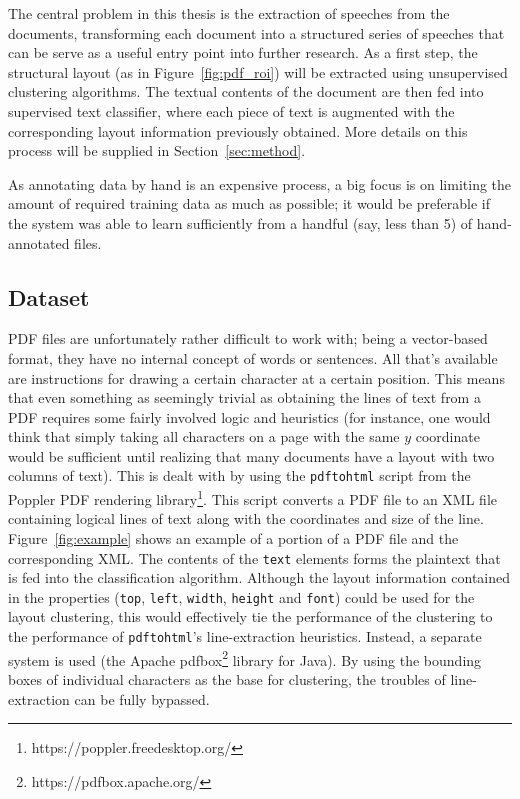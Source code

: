 The central problem in this thesis is the extraction of speeches from the
documents, transforming each document into a structured series of speeches that
can be serve as a useful entry point into further research. As a first step, the
structural layout (as in Figure~\ref{fig:pdf_roi}) will be extracted using
unsupervised clustering algorithms. The textual contents of the document are
then fed into supervised text classifier, where each piece of text is augmented
with the corresponding layout information previously obtained. More details on
this process will be supplied in Section~\ref{sec:method}.

As annotating data by hand is an expensive process, a big focus is on limiting
the amount of required training data as much as possible; it would be preferable
if the system was able to learn sufficiently from a handful (say, less than 5)
of hand-annotated files.

\subsection{Dataset}
PDF files are unfortunately rather difficult to work with; being a vector-based
format, they have no internal concept of words or sentences. All that's
available are instructions for drawing a certain character at a certain
position. This means that even something as seemingly trivial as obtaining the
lines of text from a PDF requires some fairly involved logic and heuristics (for
instance, one would think that simply taking all characters on a page with the
same $y$ coordinate would be sufficient until realizing that many documents have
a layout with two columns of text). This is dealt with by using the
\texttt{pdftohtml} script from the Poppler PDF rendering
library\footnote{https://poppler.freedesktop.org/}. This script converts a PDF
file to an XML file containing logical lines of text along with the coordinates
and size of the line. Figure~\ref{fig:example} shows an example of a portion of
a PDF file and the corresponding XML\@. The contents of the \texttt{text} elements
forms the plaintext that is fed into the classification algorithm. Although the
layout information contained in the properties (\texttt{top}, \texttt{left},
\texttt{width}, \texttt{height} and \texttt{font}) could be used for the layout
clustering, this would effectively tie the performance of the clustering to the
performance of \texttt{pdftohtml}'s line-extraction heuristics. Instead, a
separate system is used (the Apache pdfbox\footnote{https://pdfbox.apache.org/}
library for Java). By using the bounding boxes of individual characters as the
base for clustering, the troubles of line-extraction can be fully bypassed.

